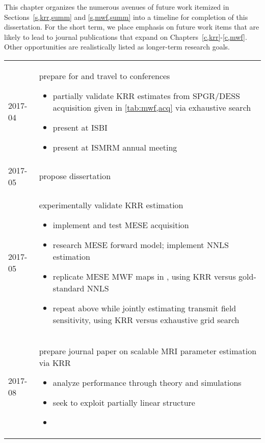 
This chapter organizes the numerous avenues 
of future work itemized 
in Sections~\ref{s,krr,summ} and \ref{s,mwf,summ}
into a timeline for completion 
of this dissertation.
For the short term,
we place emphasis
on future work items
that are likely 
to lead 
to journal publications
that expand 
on Chapters~\ref{c,krr}-\ref{c,mwf}.
Other opportunities
are realistically listed 
as longer-term research goals.

\begin{table}[!ht]
	\centering
	\begin{tabular}{l | p{12cm}}
		\hline 
		\hline
		2017-04 & prepare for and travel to conferences
			\begin{itemize}
				\setlength\topsep{0em}
				\setlength\itemsep{0em}
				\item{
					partially validate KRR estimates 
					from SPGR/DESS acquisition 
					given in \ref{tab:mwf,acq}
					via exhaustive search
				}
				\item{present \cite{nataraj:17:dfm} at ISBI}
				\item{present \cite{nataraj:17:mwf} at ISMRM annual meeting}
			\end{itemize} \\
		2017-05 & propose dissertation \\
		2017-05 & experimentally validate KRR estimation
			\begin{itemize}
				\setlength\topsep{0em}
				\setlength\itemsep{0em}
				\item{implement and test MESE acquisition}
				\item{research MESE forward model; implement NNLS estimation}
				\item{
					replicate \invivo MESE MWF maps in \cite{zhang:15:com},
					using KRR versus gold-standard NNLS
				}
				\item{
					repeat above while jointly estimating transmit field sensitivity,
					using KRR versus exhaustive grid search
				}
			\end{itemize} \\
		2017-08 & prepare journal paper on scalable MRI parameter estimation via KRR
			\begin{itemize}
				\setlength\topsep{0em}
				\setlength\itemsep{0em}
				\item{analyze performance through theory and simulations}
				\item{seek to exploit partially linear structure}
				\item{
}
\end{itemize}
\end{tabular}
\end{table}
